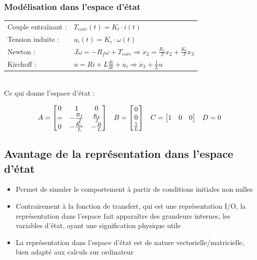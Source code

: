 \documentclass[document.tex]{subfiles}
\begin{document}
\subsubsection{Modélisation dans l'espace d'état}

\begin{tabular}{l l}

Couple entraînant : & $T_{entr}(t)=K_t \cdot i(t)$ \\
Tension induite : & $ u_i(t) = K_e \cdot
\omega(t) $ \\
Newton : & $ J\dot{\omega} = -R_f\omega+T_{entr} \Rightarrow \dot{x}_2=\frac{R_f}{J}x_2 + \frac{K_t}{J}x_3$\\
Kirchoff : & $u = Ri+L\frac{di}{dt}+u_i \Rightarrow \dot{x}_3 + \frac{1}{L}u$ 
\end{tabular}
\\[12pt]
Ce qui donne l'espace d'état : 

\begin{equation}
\begin{array}{c c c c}
	A = \begin{bmatrix}
		0 & 1 & 0 \\ = & -\frac{R_f}{J} & \frac{K_t}{J} \\ 0 & -\frac{K_e}{L} & -\frac{R}{L}
	\end{bmatrix} & B = \begin{bmatrix}
	0 \\ 0 \\ \frac{1}{L}
	\end{bmatrix} & C = \begin{bmatrix}
	1 & 0 & 0 
	\end{bmatrix} & D = 0
\end{array}
\end{equation}

\subsection{Avantage de la représentation dans l'espace d'état}

\begin{itemize}
	\item Permet de simuler le comportement à partir de conditions initiales non nulles
	\item Contrairement à la fonction de transfert, qui est une représentation I/O, la représentation dans l'espace fait apparaître des grandeurs internes, les variables d'état, ayant une signification physique utile
	\item La représentation dans l'espace d'état est de nature vectorielle/matricielle, bien adapté aux calculs sur ordinateur
\end{itemize}
\end{document}

